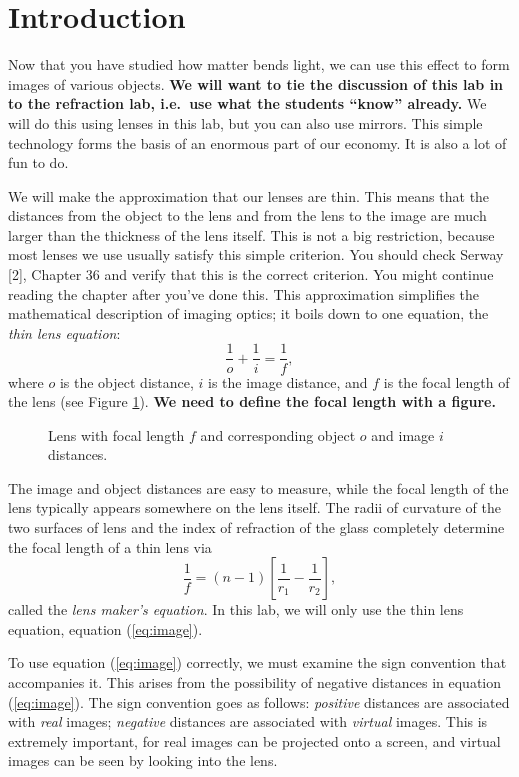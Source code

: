 \section{Introduction}

Now that you have studied how matter bends light, we can use this effect 
to form images of various objects. {\bf We will want to tie the discussion of 
this lab in to the refraction lab, i.e.\ use what the students ``know'' 
already.} We will do this using lenses in this lab, but you can also use 
mirrors. This simple technology forms the basis of an enormous part of our 
economy. It is also a lot of fun to do.

We will make the approximation that our lenses are thin. This means that 
the distances from the object to the lens and from the lens to the image
are much larger than the thickness of the lens itself. This is not a big
restriction, because most lenses we use usually satisfy this simple 
criterion. You should check Serway [2], Chapter 36 and verify that this is the 
correct criterion.  You might continue reading the chapter after you've done 
this. This approximation simplifies the mathematical description of 
imaging optics; it boils down to one equation, the {\em thin lens equation}:
\begin{equation}
\frac{1}{o} + \frac{1}{i} = \frac{1}{f}, \label{eq:image}
\end{equation}
where $o$ is the object distance, $i$ is the image distance, and $f$ is 
the focal length of the lens (see Figure \ref{fig:lens1}). {\bf We need to 
define the focal length with a figure.}
\begin{figure}[hb]
\hspace*{2.5cm} \epsfxsize=8cm \epsfysize=4cm 
\caption{Lens with focal length $f$ and corresponding object $o$ and image
$i$ distances.}
\label{fig:lens1}   
\end{figure}
The image and object distances 
are easy to measure, while the focal length of the lens typically 
appears somewhere on the lens itself. The radii of curvature of the two 
surfaces of lens and the index of refraction of the glass completely
determine the focal length of a thin lens via
$$
\frac{1}{f} = ( n - 1 ) \left[\frac{1}{r_1} - \frac{1}{r_2} \right],
$$
called the {\em lens maker's equation}. In this lab, we will only use the 
thin lens equation, equation (\ref{eq:image}).

To use equation (\ref{eq:image}) correctly, we must examine the sign 
convention that accompanies it. This arises from the possibility of negative
distances in equation (\ref{eq:image}). The sign convention goes as follows:
{\em positive} distances are associated with {\em real} images; {\em 
negative} distances are associated with {\em virtual} images. This 
is extremely important, for real images can be projected onto a screen, and
virtual images can be seen by looking into the lens.

